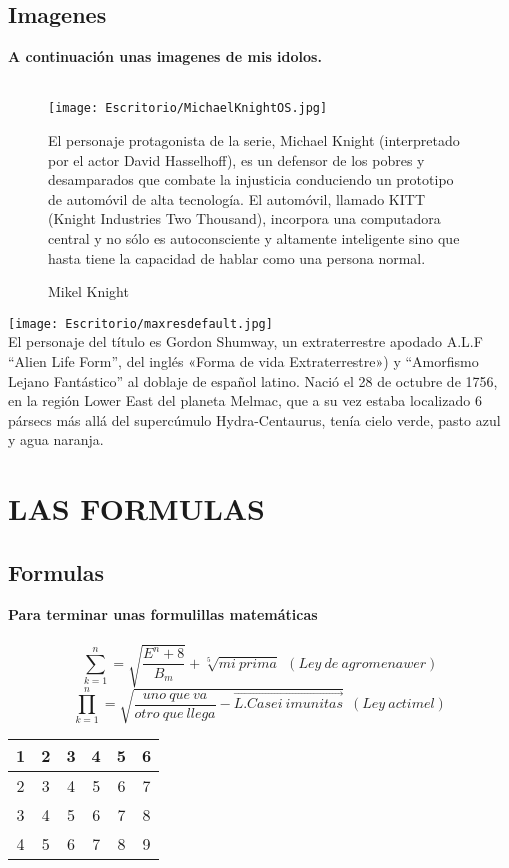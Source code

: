 \documentclass[10pt,a4paper]{book}
\begin{document}
\chapter*{Imagenes}
{\LARGE \textbf{A continuación unas imagenes de mis idolos.}}\\\\
\begin{center}
\begin{wrapfigure}{r}{0.5\textwidth} 
    \texttt{[image: Escritorio/MichaelKnightOS.jpg]}
    \caption{Mikel Knight}
    El personaje protagonista de la serie, Michael Knight (interpretado por el actor David Hasselhoff), es un defensor de los pobres y desamparados que combate la injusticia conduciendo un prototipo de automóvil de alta tecnología. El automóvil, llamado KITT (Knight Industries Two Thousand), incorpora una computadora central y no sólo es autoconsciente y altamente inteligente sino que hasta tiene la capacidad de hablar como una persona normal.
    \label{fig:databaseUserTable}
\end{wrapfigure}
\texttt{[image: Escritorio/maxresdefault.jpg]}\\ El personaje del título es Gordon Shumway, un extraterrestre apodado A.L.F “Alien Life Form”, del inglés «Forma de vida Extraterrestre») y “Amorfismo Lejano Fantástico” al doblaje de español latino. Nació el 28 de octubre de 1756, en la región Lower East del planeta Melmac, que a su vez estaba localizado 6 pársecs más allá del supercúmulo Hydra-Centaurus, tenía cielo verde, pasto azul y agua naranja.
\end{center}
\part{LAS FORMULAS}
\chapter*{Formulas} 
{\LARGE \textbf{Para terminar unas formulillas matemáticas}}\\\\
$$ \sum_{k=1}^n=\sqrt{\frac{E^{n}+8}{B_{m}}}+\sqrt[5]{mi\ prima}\ \ (Ley\ de\ agromenawer)$$
$$ \prod_{k=1}^n=\sqrt{\frac{uno\ que\ va}{otro\ que\ llega}-\overrightarrow{L.Casei\ imunitas}}\ \ (Ley\ actimel) $$
\begin{tabular}{|c|c|c|c|c|c|}
\hline 
1 & 2 & 3 & 4 & 5 & 6 \\ 
\hline 
2 & 3 & 4 & 5 & 6 & 7 \\ 
\hline 
3 & 4 & 5 & 6 & 7 & 8 \\ 
\hline 
4 & 5 & 6 & 7 & 8 & 9 \\ 
\hline 
\end{tabular} 
\end{document}
